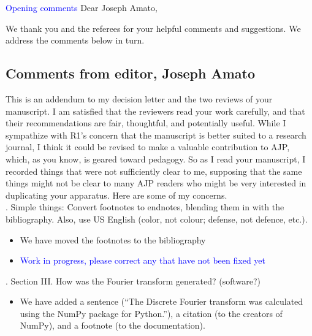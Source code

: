 \documentclass{article}
\newcommand{\todo}{\textcolor{blue}}
\begin{document}
\todo{Opening comments}
Dear Joseph Amato, 

We thank you and the referees for your helpful comments and suggestions. 
We address the comments below in turn. 

\subsection*{Comments from editor, Joseph Amato}

This is an addendum to my decision letter and the two reviews of your manuscript.  I am satisfied that the reviewers read your work carefully, and that their recommendations are fair, thoughtful, and potentially useful.  While I sympathize with R1’s concern that the manuscript is better suited to a research journal, I think it could be revised to make a valuable contribution to AJP, which, as you know, is geared toward pedagogy.  So as I read your manuscript, I recorded things that were not sufficiently clear to me, supposing that the same things might not be clear to many AJP readers who might be very interested in duplicating your apparatus.  Here are some of my concerns.  \\

. Simple things: Convert footnotes to endnotes, blending them in with the bibliography.  Also, use US English (color, not colour; defense, not defence, etc.). 
\begin{itemize}
\item We have moved the footnotes to the bibliography
\item \todo{Work in progress, please correct any that have not been fixed yet}
\end{itemize}

. Section III.  How was the Fourier transform generated?  (software?)
\begin{itemize}
\item We have added a sentence (``The Discrete Fourier transform was calculated using the NumPy package for Python.''), a citation (to the creators of NumPy), and a footnote (to the documentation).
\end{itemize}
\end{document}
